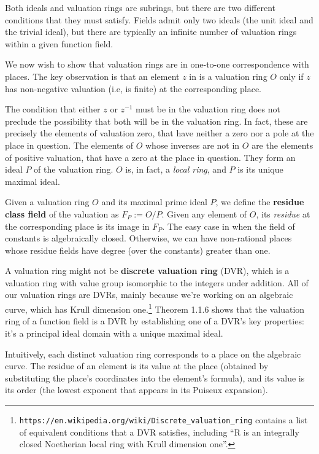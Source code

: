 Both ideals and valuation rings are subrings, but there are two different conditions
that they must satisfy.  Fields admit only two ideals (the unit ideal and the trivial ideal),
but there are typically an infinite number of valuation rings within a given function field.

We now wish to show that valuation rings are in one-to-one correspondence with places.
The key observation is that an element $z$ in is a valuation ring $O$ only if $z$ has
non-negative valuation (i.e, is finite) at the corresponding place.

The condition that either $z$ or $z^{-1}$ must be in the valuation ring does not preclude
the possibility that both will be in the valuation ring.  In fact, these are precisely
the elements of valuation zero, that have neither a zero nor a pole at the place
in question.  The elements of $O$ whose inverses are not in $O$ are the elements of positive
valuation, that have a zero at the place in question.  They form an ideal $P$ of the
valuation ring.  $O$ is, in fact, a {\it local ring}, and $P$ is its unique maximal ideal.

Given a valuation ring $O$ and its maximal prime ideal $P$, we define the {\bf residue class field} of
the valuation as $F_P := O/P$.  Given any element of $O$, its {\it residue} at the corresponding place is its
image in $F_P$.  The easy case in when the field of constants is algebraically closed.  Otherwise,
we can have non-rational places whose residue fields have degree (over the constants) greater than one.

A valuation ring might not be {\bf discrete valuation ring} (DVR),
which is a valuation ring with value group isomorphic to the integers under addition.
All of our valuation rings are DVRs, mainly because we're working on an algebraic
curve, which has Krull dimension one.\footnote{{\tt https://en.wikipedia.org/wiki/Discrete_valuation_ring}
contains a list of equivalent conditions that a DVR satisfies, including
``R is an integrally closed Noetherian local ring with Krull dimension one''.}
\cite{Stichtenoth} Theorem 1.1.6 shows that the valuation ring of a function
field is a DVR by establishing one of a DVR's key properties: it's
a principal ideal domain with a unique maximal ideal.

Intuitively, each distinct valuation ring corresponds to a place on the algebraic curve.
The residue of an element is its value at the place (obtained by substituting the place's
coordinates into the element's formula), and its value is its order (the lowest exponent
that appears in its Puiseux expansion).


